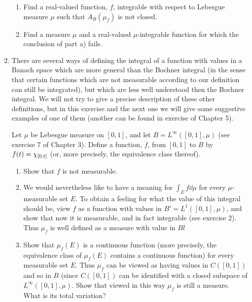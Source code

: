 \begin{enumerate}[label=\arabic*)]
\begin{enumerate}[label=\alph*)]
    \item Find a real-valued function, $f$, integrable with respect to Lebesgue measure $\mu$ such that $A_R(\mu_f)$ is not closed.

    \item Find a measure $\mu$ and a real-valued $\mu$-integrable function for which the conclusion of part a) fails.
\end{enumerate}

\item There are several ways of defining the integral of a function with values in a Banach space which are more general than the Bochner integral (in the sense that certain functions which are not measurable according to our definition can still be integrated), but which are less well understood then the Bochner integral. We will not try to give a precise description of these other definitions, but in this exercise and the next one we will give some suggestive examples of one of them (another can be found in exercise of Chapter 5).

Let $\mu$ be Lebesgue measure on $[0,1]$, and let $B=L^\infty([0,1],\mu)$ (see exercise 7 of Chapter 3). Define a function, $f$, from $[0,1]$ to $B$ by $f(t)=\chi_{[0,t]}$ (or, more precisely, the equivalence class thereof).

\begin{enumerate}[label=\alph*)]
    \item Show that $f$ is not measurable.

    \item We would nevertheless like to have a meaning for $\int_Ef\dd\mu$ for every $\mu$-measurable set $E$. To obtain a feeling for what the value of this integral should be, view $f$ as a function with values in $B'=L^1([0,1],\mu)$, and show that now it is measurable, and in fact integrable (see exercise 2). Thus $\mu_f$ is well defined as a measure with value in $Bl$

    \item Show that $\mu_f(E)$ is a continuous function (more precisely, the equivalence class of $\mu_f(E)$ contains a continuous function) for every measurable set $E$. Thus $\mu_f$ can be viewed as having values in $C([0,1])$ and so in $B$ (since $C([0,1])$ can be identified with a closed subspace of $L^\infty([0,1],\mu)$. Show that viewed in this way $\mu_f$ is still a measure. What is its total variation?


\end{enumerate}
\end{enumerate}
